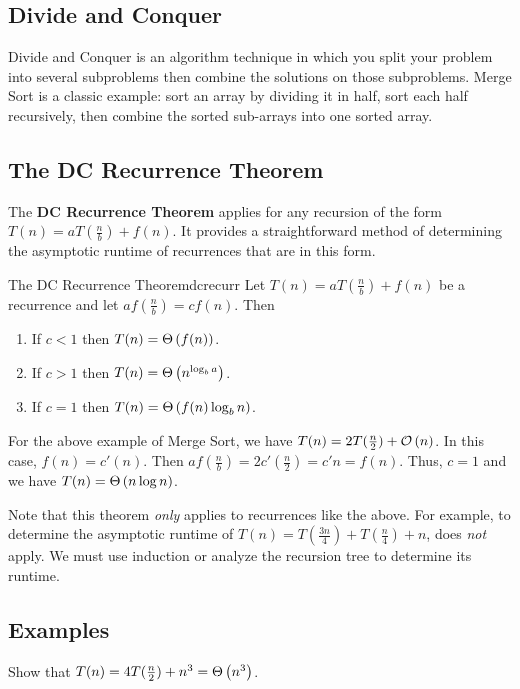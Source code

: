 \subsection{Divide and Conquer}
Divide and Conquer is an algorithm technique in which you split your problem into several subproblems then combine the solutions on those subproblems. Merge Sort is a classic example: sort an array by dividing it in half, sort each half recursively, then combine the sorted sub-arrays into one sorted array.

\subsection{The DC Recurrence Theorem}
The \textbf{DC Recurrence Theorem} applies for any recursion of the form $T(n)=aT(\frac{n}{b})+f(n)$. It provides a straightforward method of determining the asymptotic runtime of recurrences that are in this form.
\begin{theorem}{The DC Recurrence Theorem}{dcrecurr}
    Let $T(n)=aT(\frac{n}{b})+f(n)$ be a recurrence and let $af(\frac{n}{b})=cf(n)$. Then
    \begin{enumerate}
        \item If $c<1$ then $T(n)=\Theta\left(f(n)\right)$.
        \item If $c>1$ then $T(n)=\Theta\left(n^{\log_ba}\right)$.
        \item If $c=1$ then $T(n)=\Theta\left(f(n)\log_bn\right)$.
    \end{enumerate}
\end{theorem}

For the above example of Merge Sort, we have $T(n)=2T(\frac{n}{2})+\mathcal{O}\left(n\right)$. In this case, $f(n)=c'(n)$. Then $af(\frac{n}{b})=2c'(\frac{n}{2})=c'n=f(n)$. Thus, $c=1$ and we have $T(n)=\Theta\left(n\log{n}\right)$.

Note that this theorem \textit{only} applies to recurrences like the above. For example, to determine the asymptotic runtime of $T(n)=T(\frac{3n}{4})+T(\frac{n}{4})+n$,  does \textit{not} apply. We must use induction or analyze the recursion tree to determine its runtime.

\subsection{Examples}
\begin{exercise}{}{}
    Show that $T(n)=4T(\frac{n}{2})+n^3=\Theta\left(n^3\right)$.
\end{exercise}


